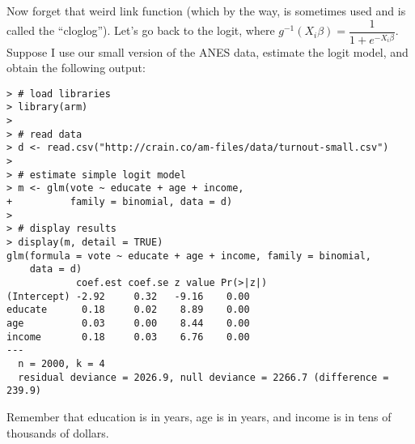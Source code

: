 \documentclass[10pt]{exam2}
\begin{document}
\begin{questions}
\question Now forget that weird link function (which by the way, is sometimes used and is called the ``cloglog''). Let's go back to the logit, where $g^{-1}(X_i \beta) = \dfrac{1}{1 + e^{-X_i\beta}}$. Suppose I use our small version of the ANES data, estimate the logit model, and obtain the following output:
\begin{verbatim}
> # load libraries
> library(arm)
> 
> # read data
> d <- read.csv("http://crain.co/am-files/data/turnout-small.csv")
> 
> # estimate simple logit model
> m <- glm(vote ~ educate + age + income, 
+          family = binomial, data = d)
> 
> # display results
> display(m, detail = TRUE)
glm(formula = vote ~ educate + age + income, family = binomial, 
    data = d)
            coef.est coef.se z value Pr(>|z|)
(Intercept) -2.92     0.32   -9.16    0.00   
educate      0.18     0.02    8.89    0.00   
age          0.03     0.00    8.44    0.00   
income       0.18     0.03    6.76    0.00   
---
  n = 2000, k = 4
  residual deviance = 2026.9, null deviance = 2266.7 (difference = 239.9)
\end{verbatim}
Remember that education is in years, age is in years, and income is in tens of thousands of dollars.
\end{questions}
\end{document}
